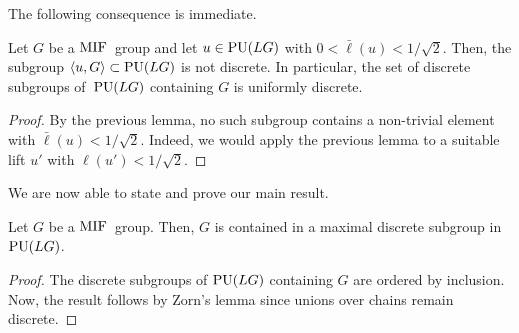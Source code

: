 The following consequence is immediate.
\begin{Corollary}
Let $G$ be a ${\rm MIF}$~group and let $u \in {\rm PU}(LG)$ with $0 < \bar \ell(u) < 1/\sqrt{2}$. Then, the subgroup $\langle u, G \rangle \subset {\rm PU}(LG)$ is not discrete.
In particular, the set of discrete subgroups of~${\rm PU}(LG)$ containing $G$ is uniformly discrete.
\end{Corollary}
\begin{proof} By the previous lemma, no such subgroup contains a non-trivial element with $\bar \ell(u)<1/\sqrt{2}$. Indeed, we would apply the previous lemma to a suitable lift $u'$ with $\ell(u')< 1/\sqrt{2}$.\end{proof}

We are now able to state and prove our main result.
\begin{Theorem} %
Let $G$ be a ${\rm MIF}$~group. Then, $G$ is contained in a maximal discrete subgroup in~${\rm PU}(LG)$.
\end{Theorem}
\begin{proof}
The discrete subgroups of ${\rm PU}(LG)$ containing $G$ are ordered by inclusion. Now, the result follows by Zorn's lemma since unions over chains remain discrete.
\end{proof}
